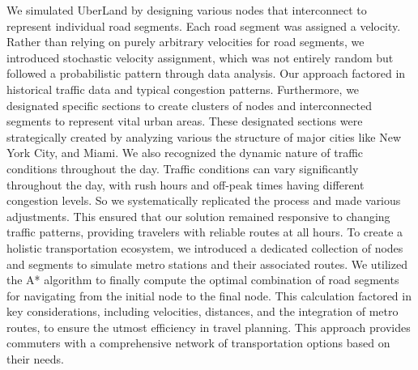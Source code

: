 \documentclass{article}
\begin{document}
We simulated UberLand by designing various nodes that interconnect to represent individual road segments. Each road segment was assigned a velocity. Rather than relying on purely arbitrary velocities for road segments, we introduced stochastic velocity assignment, which was not entirely random but followed a probabilistic pattern through data analysis. Our approach factored in historical traffic data and typical congestion patterns. Furthermore, we designated specific sections to create clusters of nodes and interconnected segments to represent vital urban areas. These designated sections were strategically created by analyzing various the structure of major cities like New York City, and Miami. We also recognized the dynamic nature of traffic conditions throughout the day. Traffic conditions can vary significantly throughout the day, with rush hours and off-peak times having different congestion levels. So we systematically replicated the process and made various adjustments. This ensured that our solution remained responsive to changing traffic patterns, providing travelers with reliable routes at all hours. To create a holistic transportation ecosystem, we introduced a dedicated collection of nodes and segments to simulate metro stations and their associated routes. We utilized the A* algorithm to finally compute the optimal combination of road segments for navigating from the initial node to the final node. This calculation factored in key considerations, including velocities, distances, and the integration of metro routes, to ensure the utmost efficiency in travel planning. This approach provides commuters with a comprehensive network of transportation options based on their needs.
\end{document}
